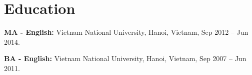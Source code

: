 \documentclass[letterpaper,10pt]{article}
\newenvironment{resume_list}{
  \vspace{-7pt}
  \begin{itemize}[itemsep=-2px, parsep=1pt, leftmargin=30pt]
}{
  \end{itemize}
}
\begin{document}
  \section{Education}
 \begin{resume_list}
 \item {\textbf{MA - English:} }{Vietnam National University, Hanoi, Vietnam, Sep 2012 --  Jun 2014.}\\
 \item {\textbf{BA - English:} }{Vietnam National University, Hanoi, Vietnam, Sep 2007 --  Jun 2011.}  
\end{resume_list}


 
\end{document}
